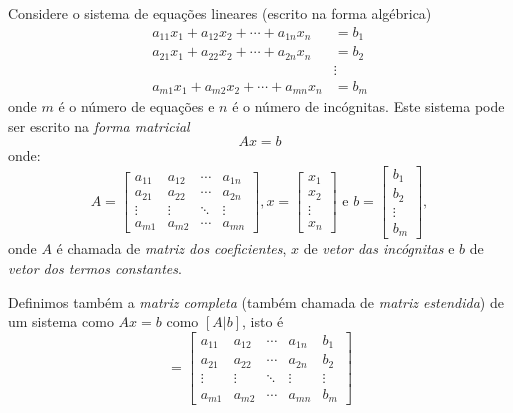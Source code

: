 \documentclass[
	12pt,				%
	oneside,			%
	a4paper,			%
	english,			%
	french,				%
	spanish,			%
	brazil				%
	]{abntex2}
\begin{document}
Considere o sistema de equações lineares (escrito na forma algébrica)
\begin{equation}
  \begin{split}
    a_{11}x_1 + a_{12}x_2 + \cdots +a_{1n}x_n &= b_1\\
    a_{21}x_1 + a_{22}x_2 + \cdots +a_{2n}x_n &= b_2\\
    &\vdots \\
    a_{m1}x_1 + a_{m2}x_2 + \cdots +a_{mn}x_n &= b_m
  \end{split}
\end{equation}
onde $m$ é o número de equações e $n$ é o número de incógnitas.  Este sistema pode ser escrito na \emph{forma matricial}
\begin{equation}
  Ax = b
\end{equation}
onde:
\begin{equation}
  A=\begin{bmatrix}
a_{11} & a_{12} & \cdots & a_{1n}\\
a_{21} & a_{22} & \cdots & a_{2n}\\
\vdots & \vdots & \ddots & \vdots\\
a_{m1} & a_{m2} & \cdots & a_{mn}
\end{bmatrix},
x=\begin{bmatrix}
x_{1} \\
x_{2} \\
\vdots \\
x_{n}
\end{bmatrix}
 \text{ e } b=\begin{bmatrix}
b_{1} \\
b_{2} \\
\vdots \\
b_{m}
\end{bmatrix},
\end{equation}
onde $A$ é chamada de \emph{matriz dos coeficientes}, $x$ de \emph{vetor das incógnitas} e $b$ de \emph{vetor dos termos constantes}.


Definimos também a \emph{matriz completa} (também chamada de \emph{matriz estendida}) de um sistema como $Ax=b$ como $[A|b]$, isto é
\begin{equation}
 [A|b]=\left[\begin{array}{cccc|c}
a_{11} & a_{12} & \cdots & a_{1n}&b_1\\
a_{21} & a_{22} & \cdots & a_{2n}&b_2\\
\vdots & \vdots & \ddots & \vdots&\vdots\\
a_{m1} & a_{m2} & \cdots & a_{mn}&b_m
\end{array}\right]
\end{equation}
\end{document}

